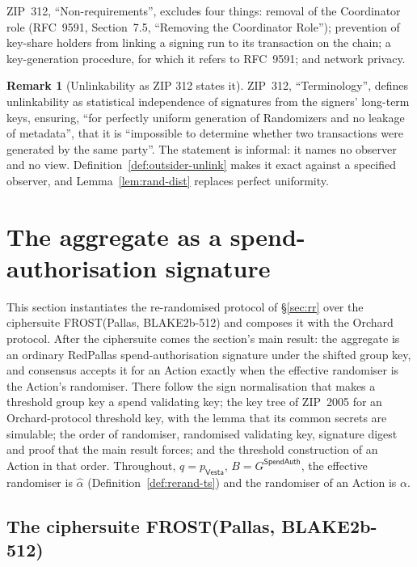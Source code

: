 \documentclass[11pt,a4paper]{article}
\theoremstyle{definition}
\newtheorem{remark}[theorem]{Remark}
\newcommand{\Vesta}{\ensuremath{\mathsf{Vesta}}}
\begin{document}
ZIP~312, ``Non-requirements'', excludes four things: removal of the
Coordinator role (RFC~9591, Section~7.5, ``Removing the Coordinator
Role''); prevention of key-share holders from linking a signing run to its
transaction on the chain; a key-generation procedure, for which it refers
to RFC~9591; and network privacy.

\begin{remark}[Unlinkability as ZIP 312 states it]\label{rem:zip-unlink}
ZIP~312, ``Terminology'', defines unlinkability as statistical independence
of signatures from the signers' long-term keys, ensuring, ``for perfectly
uniform generation of Randomizers and no leakage of metadata'', that it is
``impossible to determine whether two transactions were generated by the
same party''. The statement is informal: it names no observer and no view.
Definition~\ref{def:outsider-unlink} makes it exact against a specified
observer, and Lemma~\ref{lem:rand-dist} replaces perfect uniformity.
\end{remark}

\section{The aggregate as a spend-authorisation signature}\label{sec:auth}

This section instantiates the re-randomised protocol of \S\ref{sec:rr} over
the ciphersuite FROST(Pallas, BLAKE2b-512) and composes it with the Orchard
protocol. After the ciphersuite comes the section's main result: the
aggregate is an ordinary RedPallas spend-authorisation signature under the
shifted group key, and consensus accepts it for an Action exactly when the
effective randomiser is the Action's randomiser. There follow the sign
normalisation that makes a threshold group key a spend validating key; the
key tree of ZIP~2005 for an
Orchard-protocol threshold key, with the lemma that its common secrets are
simulable; the order of randomiser, randomised validating key, signature
digest and proof that the main result forces; and the threshold construction
of an Action in that order. Throughout, \(q = p_{\Vesta}\),
\(B = G^{\mathsf{SpendAuth}}\), the effective randomiser is \(\hat{\alpha}\)
(Definition~\ref{def:rerand-ts}) and the randomiser of an Action is
\(\alpha\).

\subsection{The ciphersuite FROST(Pallas, BLAKE2b-512)}
\label{sec:auth-suite}
\end{document}
